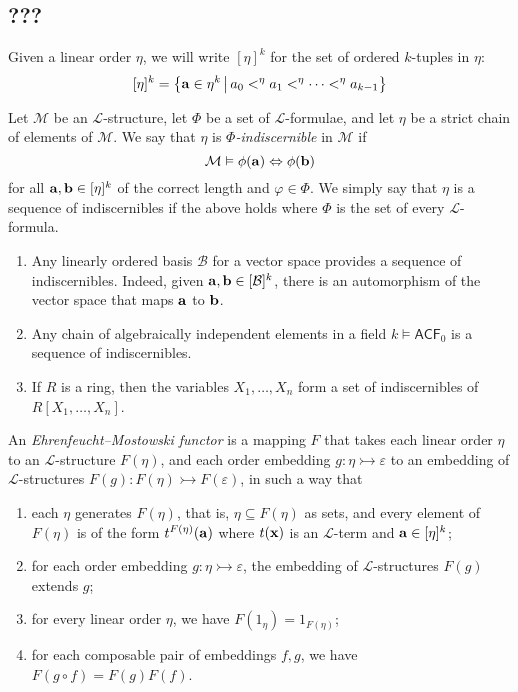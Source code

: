 \subsection{???}
Given a linear order \( \eta \), we will write \( [\eta]^k \) for the set of ordered \( k \)-tuples in \( \eta \):
\[ [\eta]^k = \qty{\vb a \in \eta^k \,\middle|\,a_0 <^\eta a_1 <^\eta \dots <^\eta a_{k-1}} \]
\begin{definition}
	Let \( \mathcal M \) be an \( \mathcal L \)-structure, let \( \Phi \) be a set of \( \mathcal L \)-formulae, and let \( \eta \) be a strict chain of elements of \( \mathcal M \).
	We say that \( \eta \) is \emph{\( \Phi \)-indiscernible} in \( \mathcal M \) if
	\[ \mathcal M \vDash \phi(\vb a) \Leftrightarrow \phi(\vb b) \]
	for all \( \vb a, \vb b \in [\eta]^k \) of the correct length and \( \varphi \in \Phi \).
	We simply say that \( \eta \) is a sequence of indiscernibles if the above holds where \( \Phi \) is the set of every \( \mathcal L \)-formula.
\end{definition}
\begin{example}
	\begin{enumerate}
		\item Any linearly ordered basis \( \mathcal B \) for a vector space provides a sequence of indiscernibles.
			Indeed, given \( \vb a, \vb b \in [\mathcal B]^k \), there is an automorphism of the vector space that maps \( \vb a \) to \( \vb b \).
		\item Any chain of algebraically independent elements in a field \( k \vDash \mathsf{ACF}_0 \) is a sequence of indiscernibles.
		\item If \( R \) is a ring, then the variables \( X_1, \dots, X_n \) form a set of indiscernibles of \( R[X_1, \dots, X_n] \).
	\end{enumerate}
\end{example}
\begin{definition}
	An \emph{Ehrenfeucht--Mostowski functor} is a mapping \( F \) that takes each linear order \( \eta \) to an \( \mathcal L \)-structure \( F(\eta) \), and each order embedding \( g : \eta \rightarrowtail \varepsilon \) to an embedding of \( \mathcal L \)-structures \( F(g) : F(\eta) \rightarrowtail F(\varepsilon) \), in such a way that
	\begin{enumerate}
		\item each \( \eta \) generates \( F(\eta) \), that is, \( \eta \subseteq F(\eta) \) as sets, and every element of \( F(\eta) \) is of the form \( t^{F(\eta)}(\vb a) \) where \( t(\vb x) \) is an \( \mathcal L \)-term and \( \vb a \in [\eta]^k \);
		\item for each order embedding \( g : \eta \rightarrowtail \varepsilon \), the embedding of \( \mathcal L \)-structures \( F(g) \) extends \( g \);
		\item for every linear order \( \eta \), we have \( F(1_\eta) = 1_{F(\eta)} \);
		\item for each composable pair of embeddings \( f, g \), we have \( F(g\circ f) = F(g)F(f) \).
	\end{enumerate}
\end{definition}
